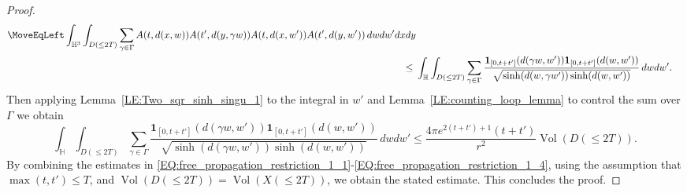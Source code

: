 \documentclass[11pt,twoside,reqno]{amsart}
\newcommand{\bH}{\mathbb{H}}
\newcommand{\1}{\mathrm{\mathbf{1}}}
\DeclareMathOperator{\Vol}{Vol}
\numberwithin{equation}{section}
\theoremstyle{plain}
\theoremstyle{definition}
\theoremstyle{remark}
\begin{document}
\begin{proof}
\begin{equation}
    \begin{aligned}
          \MoveEqLeft \int_{\bH^3}  \int_{D(\leq2T)}  \sum_{\gamma \in\Gamma}  A(t,d(x,w)) A(t',d(y,\gamma w))
          A(t,d(x,w')) A(t',d(y,w')) \, d w  d w' d xd y
          \\
          \leq{}& \int_{\bH}  \int_{D(\leq2T)}  \sum_{\gamma \in\Gamma} \frac{ \boldsymbol{1}_{[0,t+t']}(d(\gamma w, w'))\boldsymbol{1}_{[0,t+t']}(d(w,w')) }{\sqrt{\sinh (d(w,\gamma w')) \sinh (d(w,w'))}}   \, d w  d w'. 
    \end{aligned}
\end{equation}
Then applying Lemma~\ref{LE:Two_sqr_sinh_singu_1} to the integral in $w'$ and Lemma~\ref{LE:counting_loop_lemma} to control the sum over $\Gamma$ we obtain  
\begin{equation}\label{EQ:free_propagation_restriction_1_4}
          \int_{\bH}  \int_{D(\leq2T)}  \sum_{\gamma \in\Gamma} \frac{ \boldsymbol{1}_{[0,t+t']}(d(\gamma w, w'))\boldsymbol{1}_{[0,t+t']}(d(w,w')) }{\sqrt{\sinh (d(\gamma w, w')) \sinh (d(w,w'))}}   \, d w  d w' 
          \leq   \frac{4 \pi e^{2(t+t')+1 }(t+t')}{ r^2} \Vol(  D(\leq2T)).
\end{equation}
By combining the estimates in \eqref{EQ:free_propagation_restriction_1_1}-\eqref{EQ:free_propagation_restriction_1_4}, using the assumption that $\max(t,t')\leq T$, and $ \Vol(D(\leq2T)) =  \Vol(  X(\leq2T))$, we obtain the stated estimate. This concludes the proof.
\end{proof}
\end{document}
